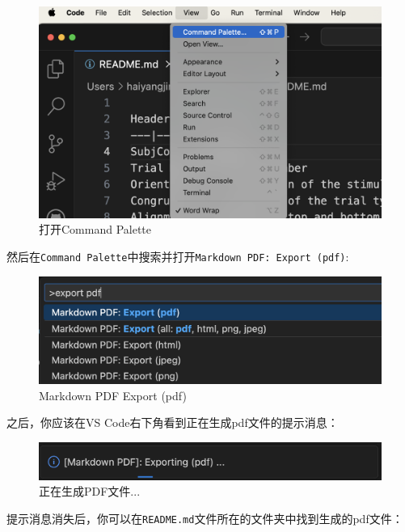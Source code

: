 \documentclass[]{ctexbook}
\theoremstyle{definition}
\theoremstyle{definition}
\theoremstyle{definition}
\theoremstyle{definition}
\theoremstyle{remark}
\begin{document}
\begin{figure}

{\centering \includegraphics[width=0.75\linewidth]{img/vscode/mkreadme_palette} 

}

\caption{打开Command Palette}\label{fig:mkreadme-palette}
\end{figure}

然后在\texttt{Command\ Palette}中搜索并打开\texttt{Markdown\ PDF:\ Export\ (pdf)}:

\begin{figure}

{\centering \includegraphics[width=0.6\linewidth]{img/vscode/mkreadme_exportpdf} 

}

\caption{Markdown PDF Export (pdf)}\label{fig:mkreadme-exportpdf}
\end{figure}

之后，你应该在VS Code右下角看到正在生成pdf文件的提示消息：

\begin{figure}

{\centering \includegraphics[width=0.8\linewidth]{img/vscode/mkreadme_exportmessage} 

}

\caption{正在生成PDF文件...}\label{fig:mkreadme-exportmessage}
\end{figure}

提示消息消失后，你可以在\texttt{README.md}文件所在的文件夹中找到生成的pdf文件：
\end{document}

